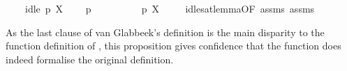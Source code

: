 \begin{isabellebody}
\ \ \ \ {\isacartoucheopen}idle\ p\ X{\isacartoucheclose}\isanewline
\ \ \ \ {\isacartoucheopen}p\ {\isasymTTurnstile}\ {\isasymphi}{\isacartoucheclose}\isanewline
\ \ \ \isanewline
\ \ \ \ {\isacartoucheopen}p\ {\isasymTTurnstile}{\isacharbrackleft}{\kern0pt}X{\isacharbrackright}{\kern0pt}\ {\isasymphi}{\isacartoucheclose}\isanewline
%
\isadelimproof
\ \ %
\endisadelimproof
%
\isatagproof
{}\isamarkupfalse%
\ idle{\isacharunderscore}{\kern0pt}sat{\isacharunderscore}{\kern0pt}lemma{\isacharbrackleft}{\kern0pt}OF\ assms{\isacharparenleft}{\kern0pt}{}{\isacharcomma}{\kern0pt}{}{\isacharparenright}{\kern0pt}{\isacharbrackright}{\kern0pt}\ assms{\isacharparenleft}{\kern0pt}{}{\isacharparenright}{\kern0pt}\ \isacommand{{\isachardot}{\kern0pt}{\isachardot}{\kern0pt}}\isamarkupfalse%
%
\endisatagproof
{\isafoldproof}%
%
\isadelimproof
%
\endisadelimproof
%
\begin{isamarkuptext}%
As the last clause of van Glabbeek's definition is the main disparity to the function definition of , this proposition gives confidence that the function does indeed formalise the original definition.%
\end{isamarkuptext}\isamarkuptrue%
\isamarkupfalse%
\ %
%
\isadelimtheory
%
\endisadelimtheory
%
\isatagtheory
%
\endisatagtheory
{\isafoldtheory}%
%
\isadelimtheory
%
\endisadelimtheory
%
\end{isabellebody}%
\endinput
